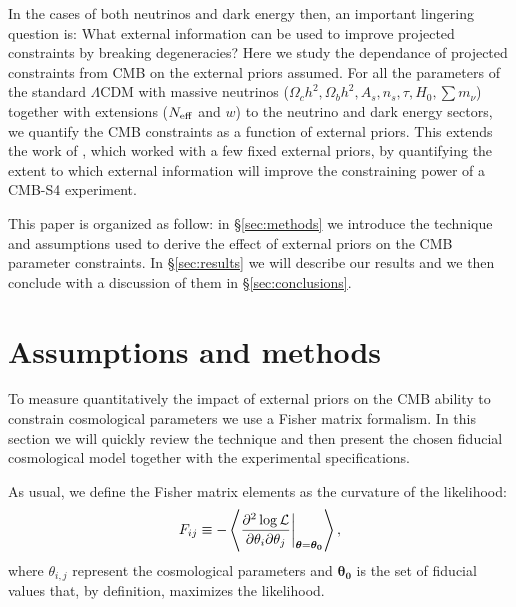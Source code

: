 \documentclass[aps,prd,reprint,superscriptaddress,nofootinbib]{revtex4-1}
\newcommand\refsec[1]{\S\ref{sec:#1}}
\begin{document}
In the cases of both neutrinos and dark energy then, an important lingering question is: What external information can be used to improve projected constraints by breaking degeneracies?
Here we study the dependance of projected constraints from CMB on the external priors assumed. For all the parameters of the standard $\Lambda$CDM with massive neutrinos ($\Omega_ch^2, \Omega_bh^2, A_s, n_s, \tau, H_0, \sum m_\nu$) together with extensions ($N_{\rm eff}$ and $w$) to the neutrino and dark energy sectors, we quantify the CMB constraints as a function of external priors. This extends the work of \citet{wu:2014}, which worked with a few fixed external priors, by quantifying the extent to which external information will improve the constraining power of a CMB-S4 experiment. 

This paper is organized as follow: in \refsec{methods} we introduce the technique and assumptions used to derive the effect of external priors on the CMB parameter constraints. In \refsec{results} we will describe our results and we then conclude with a discussion of them in \refsec{conclusions}.



\section{Assumptions and methods \label{sec:methods}}


To measure quantitatively the impact of external priors on the CMB ability to constrain cosmological parameters we use a Fisher matrix formalism. In this section we will quickly review the technique and then present the chosen fiducial cosmological model together with the experimental specifications.

As usual, we define the Fisher matrix elements as the curvature of the likelihood:
\begin{equation}
	\centering
		F_{ij} \equiv - \left\langle\frac{\partial^2 \log \mathcal{L}}{\partial \theta_i \partial \theta_j} \bigg|_{\boldsymbol{\theta} = \boldsymbol{\theta_0}}\right\rangle,
	\label{eqn:Fij_def}
\end{equation}
where $\theta_{i,j}$ represent the cosmological parameters and $\boldsymbol{\theta_0}$ is the set of fiducial values that, by definition, maximizes the likelihood. 
\end{document}

